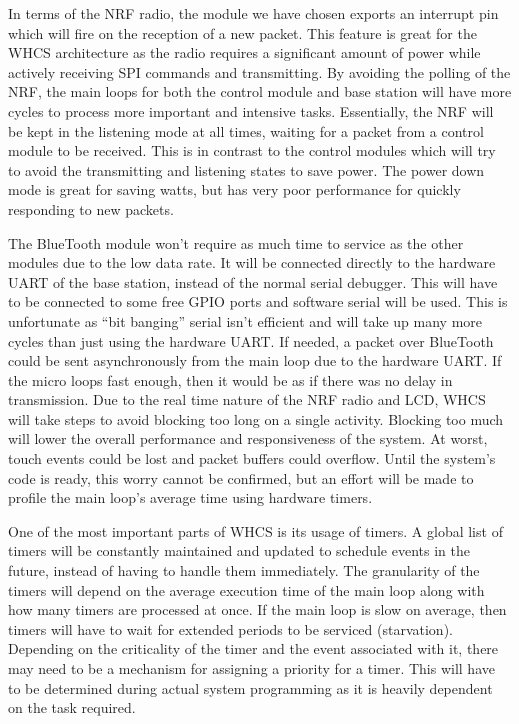 In terms of the NRF radio, the module we have chosen exports an interrupt pin
which will fire on the reception of a new packet. This feature is great for the
WHCS architecture as the radio requires a significant amount of power
while actively receiving SPI commands and transmitting. By avoiding the polling
of the NRF, the main loops for both the control module and base station will
have more cycles to process more important and intensive tasks. Essentially,
the NRF will be kept in the listening mode at all times, waiting for a packet
from a control module to be received. This is in contrast to the control
modules which will try to avoid the transmitting and listening states to save
power. The power down mode is great for saving watts, but has very poor
performance for quickly responding to new packets.

The BlueTooth module won't require as much time to service as the other modules
due to the low data rate. It will be connected directly to the hardware UART of
the base station, instead of the normal serial debugger. This will have to be
connected to some free GPIO ports and software serial will be used. This is
unfortunate as ``bit banging'' serial isn't efficient and will take up many
more cycles than just using the hardware UART. If needed, a packet over
BlueTooth could be sent asynchronously from the main loop due to the hardware
UART. If the micro loops fast enough, then it would be as if there was no delay
in transmission. Due to the real time nature of the NRF radio and LCD, WHCS
will take steps to avoid blocking too long on a single activity. Blocking too
much will lower the overall performance and responsiveness of the system. At
worst, touch events could be lost and packet buffers could overflow. Until the
system's code is ready, this worry cannot be confirmed, but an effort will be
made to profile the main loop's average time using hardware timers.

One of the most important parts of WHCS is its usage of timers. A global list
of timers will be constantly maintained and updated to schedule events
in the future, instead of having to handle them immediately. The granularity of
the timers will depend on the average execution time of the main loop along
with how many timers are processed at once. If the main loop is slow on
average, then timers will have to wait for extended periods to be serviced
(starvation). Depending on the criticality of the timer and the event
associated with it, there may need to be a mechanism for assigning a priority
for a timer. This will have to be determined during actual system programming
as it is heavily dependent on the task required.

